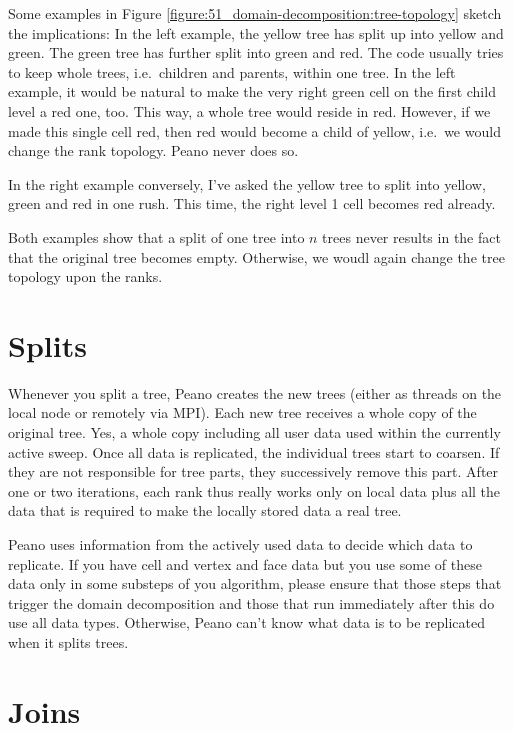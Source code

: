 Some examples in Figure \ref{figure:51_domain-decomposition:tree-topology}
sketch the implications:
In the left example, the yellow tree has split up into yellow and green. The
green tree has further split into green and red.
The code usually tries to keep whole trees, i.e.~children and parents, within
one tree.
In the left example, it would be natural to make the very right green cell on
the first child level a red one, too.
This way, a whole tree would reside in red.
However, if we made this single cell red, then red would become a child of
yellow, i.e.~we would change the rank topology.
Peano never does so.

In the right example conversely, I've asked the yellow tree to split into
yellow, green and red in one rush. 
This time, the right level 1 cell becomes red already. 

Both examples show that a split of one tree into $n$ trees never
results in the fact that the original tree becomes empty.
Otherwise, we woudl again change the tree topology upon the ranks.


\section{Splits}

Whenever you split a tree, Peano creates the new trees (either as threads on
the local node or remotely via MPI). 
Each new tree receives a whole copy of the original tree. 
Yes, a whole copy including all user data used within the currently active
sweep.
Once all data is replicated, the individual trees start to coarsen.
If they are not responsible for tree parts, they successively remove this part. 
After one or two iterations, each rank thus really works only on local data plus
all the data that is required to make the locally stored data a real tree.


\begin{remarks}
 Peano uses information from the actively used data to decide which data to
 replicate.
 If you have cell and vertex and face data but you use some of these data only
 in some substeps of you algorithm, please ensure that those steps that trigger
 the domain decomposition and those that run immediately after this do use all
 data types.
 Otherwise, Peano can't know what data is to be replicated when it splits trees.
\end{remarks}


\section{Joins}

